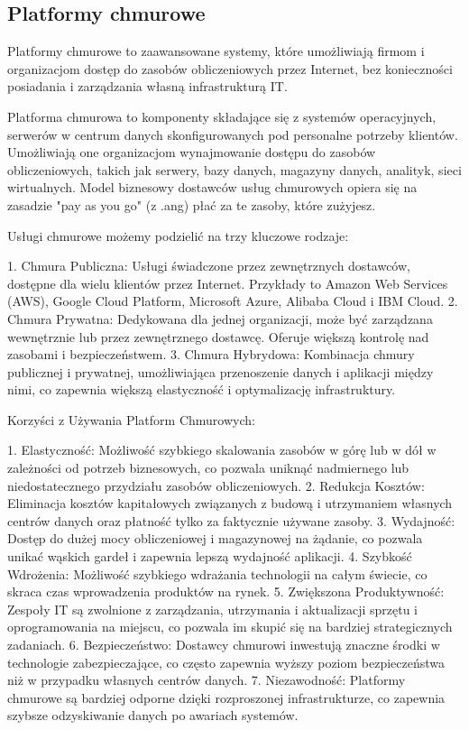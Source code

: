 \clearpage

\subsection{Platformy chmurowe}
Platformy chmurowe to zaawansowane systemy, które umożliwiają firmom i organizacjom dostęp do zasobów obliczeniowych przez Internet, bez konieczności posiadania i zarządzania własną infrastrukturą IT.

Platforma chmurowa to komponenty składające się z systemów operacyjnych, serwerów w centrum danych skonfigurowanych pod personalne potrzeby klientów. Umożliwiają one organizacjom wynajmowanie dostępu do zasobów obliczeniowych, takich jak serwery, bazy danych, magazyny danych, analityk, sieci wirtualnych. Model biznesowy dostawców usług chmurowych opiera się na zasadzie "pay as you go" (z .ang) płać za te zasoby, które zużyjesz.

Usługi chmurowe możemy podzielić na trzy kluczowe rodzaje:

1. Chmura Publiczna: Usługi świadczone przez zewnętrznych dostawców, dostępne dla wielu klientów przez Internet. Przykłady to Amazon Web Services (AWS), Google Cloud Platform, Microsoft Azure, Alibaba Cloud i IBM Cloud.
2. Chmura Prywatna: Dedykowana dla jednej organizacji, może być zarządzana wewnętrznie lub przez zewnętrznego dostawcę. Oferuje większą kontrolę nad zasobami i bezpieczeństwem.
3. Chmura Hybrydowa: Kombinacja chmury publicznej i prywatnej, umożliwiająca przenoszenie danych i aplikacji między nimi, co zapewnia większą elastyczność i optymalizację infrastruktury.

Korzyści z Używania Platform Chmurowych:

1. Elastyczność: Możliwość szybkiego skalowania zasobów w górę lub w dół w zależności od potrzeb biznesowych, co pozwala uniknąć nadmiernego lub niedostatecznego przydziału zasobów obliczeniowych.
2. Redukcja Kosztów: Eliminacja kosztów kapitałowych związanych z budową i utrzymaniem własnych centrów danych oraz płatność tylko za faktycznie używane zasoby.
3. Wydajność: Dostęp do dużej mocy obliczeniowej i magazynowej na żądanie, co pozwala unikać wąskich gardeł i zapewnia lepszą wydajność aplikacji.
4. Szybkość Wdrożenia: Możliwość szybkiego wdrażania technologii na całym świecie, co skraca czas wprowadzenia produktów na rynek.
5. Zwiększona Produktywność: Zespoły IT są zwolnione z zarządzania, utrzymania i aktualizacji sprzętu i oprogramowania na miejscu, co pozwala im skupić się na bardziej strategicznych zadaniach.
6. Bezpieczeństwo: Dostawcy chmurowi inwestują znaczne środki w technologie zabezpieczające, co często zapewnia wyższy poziom bezpieczeństwa niż w przypadku własnych centrów danych.
7. Niezawodność: Platformy chmurowe są bardziej odporne dzięki rozproszonej infrastrukturze, co zapewnia szybsze odzyskiwanie danych po awariach systemów.


